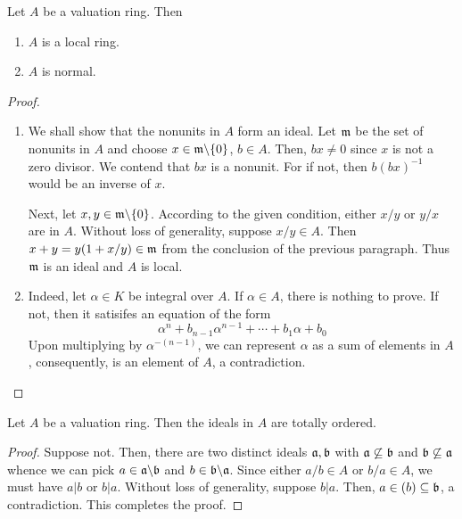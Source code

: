 \begin{proposition}
    Let $A$ be a valuation ring. Then 
    \begin{enumerate}[label=(\alph*)]
        \item $A$ is a local ring. 
        \item $A$ is normal.
    \end{enumerate}
\end{proposition}
\begin{proof}
\begin{enumerate}[label=(\alph*)]
    \item We shall show that the nonunits in $A$ form an ideal. Let $\mathfrak m$ be the set of nonunits in $A$ and choose $x\in\mathfrak m\backslash\{0\}$, $b\in A$. Then, $bx\ne 0$ since $x$ is not a zero divisor. We contend that $bx$ is a nonunit. For if not, then $b(bx)^{-1}$ would be an inverse of $x$.

    Next, let $x,y\in\mathfrak m\backslash\{0\}$. According to the given condition, either $x/y$ or $y/x$ are in $A$. Without loss of generality, suppose $x/y\in A$. Then $x + y = y(1 + x/y)\in\mathfrak m$ from the conclusion of the previous paragraph. Thus $\mathfrak m$ is an ideal and $A$ is local.

    \item Indeed, let $\alpha\in K$ be integral over $A$. If $\alpha\in A$, there is nothing to prove. If not, then it satisifes an equation of the form 
    \begin{equation*}
        \alpha^n + b_{n - 1}\alpha^{n - 1} + \cdots + b_1\alpha + b_0
    \end{equation*}
    Upon multiplying by $\alpha^{-(n - 1)}$, we can represent $\alpha$ as a sum of elements in $A$, consequently, is an element of $A$, a contradiction.
\end{enumerate}
\end{proof}

\begin{proposition}
    Let $A$ be a valuation ring. Then the ideals in $A$ are totally ordered.
\end{proposition}
\begin{proof}
    Suppose not. Then, there are two distinct ideals $\mathfrak a,\mathfrak b$ with $\mathfrak a\not\subseteq\mathfrak b$ and $\mathfrak b\not\subseteq\mathfrak a$ whence we can pick $a\in\mathfrak a\backslash\mathfrak b$ and $b\in\mathfrak b\backslash\mathfrak a$. Since either $a/b\in A$ or $b/a\in A$, we must have $a|b$ or $b|a$. Without loss of generality, suppose $b|a$. Then, $a\in(b)\subseteq\mathfrak b$, a contradiction. This completes the proof.
\end{proof}

